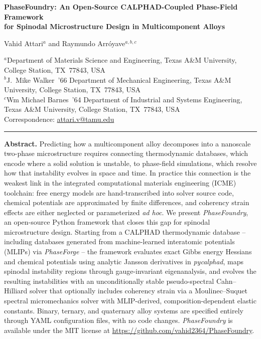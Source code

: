\documentclass[12pt]{article}
\begin{document}

\vspace*{4pt}
{\noindent\LARGE\sffamily\bfseries
PhaseFoundry: An Open-Source CALPHAD-Coupled Phase-Field Framework\\
for Spinodal Microstructure Design in Multicomponent Alloys}

\vspace{12pt}

{\noindent\large
Vahid Attari$^{a}$ and Raymundo Arr\'oyave$^{a,b,c}$}

\vspace{6pt}

{\noindent\small
$^{a}$Department of Materials Science and Engineering, Texas A\&M University,
College Station, TX~77843, USA\\
$^{b}$J.\ Mike Walker~'66 Department of Mechanical Engineering, Texas A\&M University,
College Station, TX~77843, USA\\
$^{c}$Wm Michael Barnes~'64 Department of Industrial and Systems Engineering,
Texas A\&M University, College Station, TX~77843, USA\\[3pt]
Correspondence: \href{mailto:attari.v@tamu.edu}{attari.v@tamu.edu}}

\vspace{10pt}

\noindent\rule{\linewidth}{1pt}
\vspace{4pt}

\noindent\textbf{Abstract.}\quad
Predicting how a multicomponent alloy decomposes into a nanoscale two-phase microstructure requires connecting thermodynamic databases, which encode where a solid solution is unstable, to phase-field simulations, which resolve how that instability evolves in space and time. In practice this connection is the weakest link in the integrated computational materials engineering (ICME) toolchain: free energy models are hand-transcribed into solver source code, chemical potentials are approximated by finite differences, and coherency strain effects are either neglected or parameterized \textit{ad hoc}. We present \textit{PhaseFoundry}, an open-source Python framework that closes this gap for spinodal microstructure design. Starting from a CALPHAD thermodynamic database -- including databases generated from machine-learned interatomic potentials (MLIPs) via \textit{PhaseForge} -- the framework evaluates exact Gibbs energy Hessians and chemical potentials using analytic Jansson derivatives in \textit{pycalphad}, maps spinodal instability regions through gauge-invariant eigenanalysis, and evolves the resulting instabilities with an unconditionally stable pseudo-spectral Cahn--Hilliard solver that optionally includes coherency strain via a Moulinec--Suquet spectral micromechanics solver with MLIP-derived, composition-dependent elastic constants. Binary, ternary, and quaternary alloy systems are specified entirely through YAML configuration files, with no code changes. \textit{PhaseFoundry} is available under the MIT license at \url{https://github.com/vahid2364/PhaseFoundry}.
\end{document}
